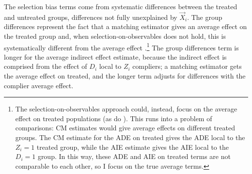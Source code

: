 The selection bias terms come from systematic differences between the treated and untreated groups, differences not fully unexplained by $\vec X_i$.
The group differences represent the fact that a matching estimator gives an average effect on the treated group and, when selection-on-observables does not hold, this is systematically different from the average effect \citep{heckman1998characterizing}.\footnote{
    The selection-on-observables approach could, instead, focus on the average effect on treated populations (as do \citealt{keele2015identifying}).
    This runs into a problem of comparisons: CM estimates would give average effects on different treated groups.
    The CM estimate for the ADE on treated gives the ADE local to the $Z_i = 1$ treated group, while the AIE estimate gives the AIE local to the $D_i = 1$ group.
    In this way, these ADE and AIE on treated terms are not comparable to each other, so I focus on the true average terms.
}
The group differences term is longer for the average indirect effect estimate, because the indirect effect is comprised from the effect of $D_i$ local to $Z_i$ compliers; a matching estimator gets the average effect on treated, and the longer term adjusts for differences with the complier average effect.
